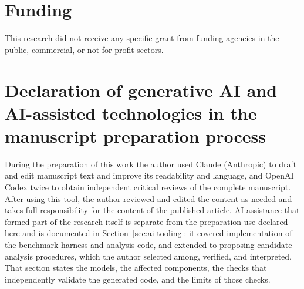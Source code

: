 \documentclass[review]{elsarticle}
\begin{document}
\section*{Funding}
This research did not receive any specific grant from funding agencies in the
public, commercial, or not-for-profit sectors.

\section*{Declaration of generative AI and AI-assisted technologies in the manuscript preparation process}
During the preparation of this work the author used Claude (Anthropic) to draft and edit
manuscript text and improve its readability and language, and OpenAI Codex twice to obtain
independent critical reviews of the complete manuscript. After using this tool, the author
reviewed and edited the content as needed and takes full responsibility for the content of
the published article. AI assistance that formed part of the research itself is separate from the preparation
use declared here and is documented in Section~\ref{sec:ai-tooling}: it covered implementation of the
benchmark harness and analysis code, and extended to proposing candidate analysis procedures, which
the author selected among, verified, and interpreted. That section states the models, the affected
components, the checks that independently validate the generated code, and the limits of those checks.



\end{document}
